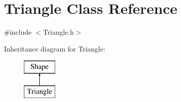 \hypertarget{class_triangle}{}\section{Triangle Class Reference}
\label{class_triangle}


{\ttfamily \#include $<$Triangle.\+h$>$}

Inheritance diagram for Triangle\+:\begin{figure}[H]
\begin{center}
\leavevmode
\includegraphics[height=2.000000cm]{class_triangle}
\end{center}
\end{figure}
